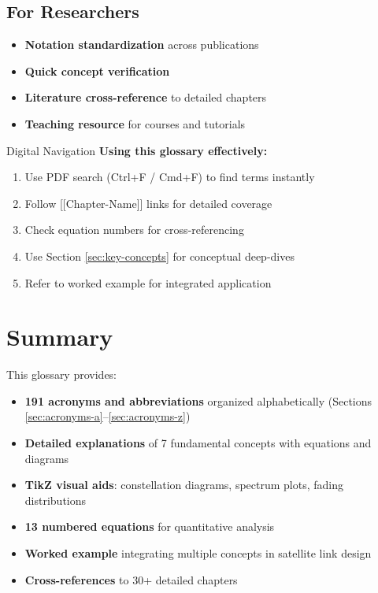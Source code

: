 \subsection{For Researchers}
\begin{itemize}
\item \textbf{Notation standardization} across publications
\item \textbf{Quick concept verification}
\item \textbf{Literature cross-reference} to detailed chapters
\item \textbf{Teaching resource} for courses and tutorials
\end{itemize}

\begin{calloutbox}{Digital Navigation}
\textbf{Using this glossary effectively:}
\begin{enumerate}
\item Use PDF search (Ctrl+F / Cmd+F) to find terms instantly
\item Follow {[}{[}Chapter-Name{]}{]} links for detailed coverage
\item Check equation numbers for cross-referencing
\item Use Section \ref{sec:key-concepts} for conceptual deep-dives
\item Refer to worked example for integrated application
\end{enumerate}
\end{calloutbox}

\section{Summary}

This glossary provides:
\begin{itemize}
\item \textbf{191 acronyms and abbreviations} organized alphabetically (Sections \ref{sec:acronyms-a}--\ref{sec:acronyms-z})
\item \textbf{Detailed explanations} of 7 fundamental concepts with equations and diagrams
\item \textbf{TikZ visual aids}: constellation diagrams, spectrum plots, fading distributions
\item \textbf{13 numbered equations} for quantitative analysis
\item \textbf{Worked example} integrating multiple concepts in satellite link design
\item \textbf{Cross-references} to 30+ detailed chapters
\end{itemize}

